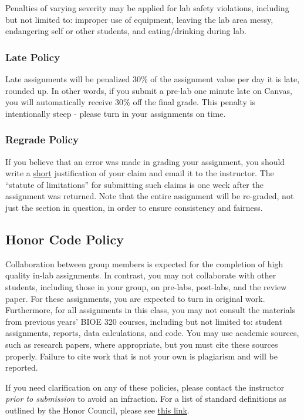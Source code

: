 \documentclass{article}
\begin{document}
Penalties of varying severity may be applied for lab safety violations, including but not limited to: improper use of equipment, leaving the lab area messy, endangering self or other students, and eating/drinking during lab.

\subsubsection*{Late Policy}
Late assignments will be penalized 30\% of the assignment value per day it is late, rounded up. In other words, if you submit a pre-lab one minute late on Canvas, you will automatically receive 30\% off the final grade. This penalty is intentionally steep - please turn in your assignments on time.

\subsubsection*{Regrade Policy}
If you believe that an error was made in grading your assignment, you should write a \underline{short} justification of your claim and email it to the instructor. The “statute of limitations” for submitting such claims is one week after the assignment was returned. Note that the entire assignment will be re-graded, not just the section in question, in order to ensure consistency and fairness.

\subsection*{Honor Code Policy}
Collaboration between group members is expected for the completion of high quality in-lab assignments. In contrast, you may not collaborate with other students, including those in your group, on pre-labs, post-labs, and the review paper. For these assignments, you are expected to turn in original work. Furthermore, for all assignments in this class, you may not consult the materials from previous years' BIOE 320 courses, including but not limited to: student assignments, reports, data calculations, and code. You may use academic sources, such as research papers, where appropriate, but you must cite these sources properly. Failure to cite work that is not your own is plagiarism and will be reported.

If you need clarification on any of these policies, please contact the instructor \textit{prior to submission} to avoid an infraction. For a list of standard definitions as outlined by the Honor Council, please see \href{https://cpb-us-e1.wpmucdn.com/blogs.rice.edu/dist/c/490/files/2022/08/Honor-Council-Standard-Definitions-and-Policies.pdf}{this link}.
\end{document}
